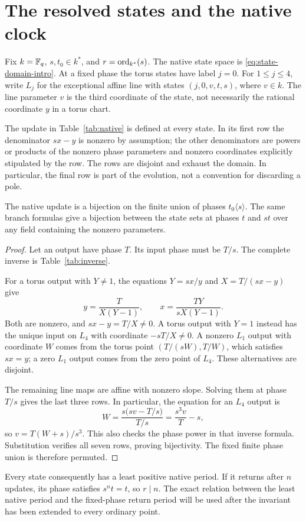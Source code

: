 \section{The resolved states and the native clock}\label{sec:states}

Fix \(k=\mathbb F_q\), \(s,t_0\in k^*\), and
\(r=\operatorname{ord}_{k^*}(s)\). The native state space is
\eqref{eq:state-domain-intro}. At a fixed phase the torus states have
label \(j=0\). For \(1\le j\le4\), write \(L_j\) for the
exceptional affine line with states \((j,0,v,t,s)\), where \(v\in k\).
The line parameter \(v\) is the third coordinate of the state, not
necessarily the rational coordinate \(y\) in a torus chart.



The update in Table~\ref{tab:native} is defined at every state.
In its first row the denominator \(sx-y\) is nonzero by assumption;
the other denominators are powers or products of the nonzero phase
parameters and nonzero coordinates explicitly stipulated by the row.
The rows are disjoint and exhaust the domain. In particular, the final
row is part of the evolution, not a convention for discarding a pole.

\begin{proposition}\label{prop:permutation}
The native update is a bijection on the finite union of phases
\(t_0\langle s\rangle\). The same branch formulas give a bijection
between the state sets at phases \(t\) and \(st\) over any field
containing the nonzero parameters.
\end{proposition}

\begin{proof}
Let an output have phase \(T\). Its input phase must be \(T/s\).
The complete inverse is Table~\ref{tab:inverse}.



For a torus output with \(Y\ne1\), the equations
\(Y=sx/y\) and \(X=T/(sx-y)\) give
\[
y=\frac{T}{X(Y-1)},\qquad
x=\frac{TY}{sX(Y-1)}.
\]
Both are nonzero, and \(sx-y=T/X\ne0\). A torus output with
\(Y=1\) instead has the unique input on \(L_4\) with coordinate
\(-sT/X\ne0\). A nonzero \(L_1\) output with coordinate \(W\)
comes from the torus point \((T/(sW),T/W)\), which satisfies
\(sx=y\); a zero \(L_1\) output comes from the zero point of
\(L_4\). These alternatives are disjoint.

The remaining line maps are affine with nonzero slope. Solving them
at phase \(T/s\) gives the last three rows. In particular, the
equation for an \(L_4\) output is
\[
W=\frac{s\bigl(sv-T/s\bigr)}{T/s}
=\frac{s^3v}{T}-s,
\]
so \(v=T(W+s)/s^3\). This also checks the phase power in that
inverse formula. Substitution verifies all seven rows, proving
bijectivity. The fixed finite phase union is therefore permuted.
\end{proof}

Every state consequently has a least positive native period. If it
returns after \(n\) updates, its phase satisfies \(s^nt=t\), so
\(r\mid n\). The exact relation between the least native period
and the fixed-phase return period will be used after the invariant
has been extended to every ordinary point.
